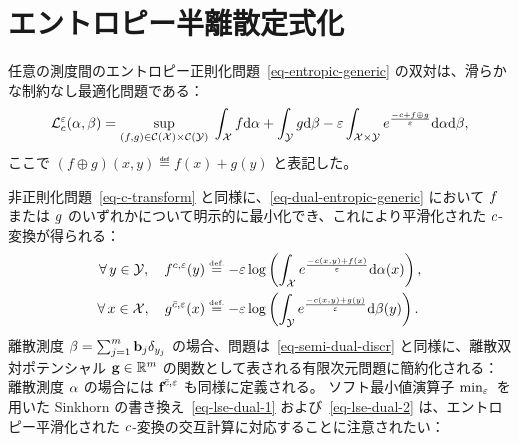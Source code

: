 \section{エントロピー半離散定式化}
\label{sec-semi-discr-entropy}

任意の測度間のエントロピー正則化問題~\eqref{eq-entropic-generic} の双対は、滑らかな制約なし最適化問題である：
\begin{equation}\label{eq-dual-entropic-generic}
	\mathcal{L}_c^\varepsilon(\alpha,\beta) =
	\underset{(f,g) \in \mathcal{C}(\mathcal{X}) \times \mathcal{C}(\mathcal{Y})}{\sup}\;
		 \int_{\mathcal{X}} f\mathrm{d}\alpha + \int_{\mathcal{Y}} g\mathrm{d}\beta
		- \varepsilon \int_{\mathcal{X} \times \mathcal{Y}}  e^{ \frac{-c + f \oplus g }{\varepsilon} } \mathrm{d}\alpha\mathrm{d}\beta,
\end{equation}
ここで $(f\oplus g)(x,y) \eqdef f(x)+g(y)$ と表記した。

非正則化問題~\eqref{eq-c-transform} と同様に、\eqref{eq-dual-entropic-generic} において $f$ または $g$ のいずれかについて明示的に最小化でき、これにより平滑化された $c$-変換が得られる：
\begin{align*}
	\forall \, y \in \mathcal{Y}, \quad
	f^{c,\varepsilon}(y) &\stackrel{\mbox{\upshape\tiny def.}}{=} - \varepsilon \log\left( 
			\int_{\mathcal{X}} e^{\frac{-c(x,y) + f(x)}{\varepsilon}} \mathrm{d}\alpha(x)
	 \right),\\
	\forall \, x \in \mathcal{X}, \quad
	g^{\bar{c},\varepsilon}(x) &\stackrel{\mbox{\upshape\tiny def.}}{=} - \varepsilon \log\left( 
			\int_{\mathcal{Y}} e^{\frac{-c(x,y) + g(y)}{\varepsilon}} \mathrm{d}\beta(y)
	 \right).
\end{align*}
離散測度 $\beta = \sum_{j=1}^m \mathrm{\textbf{b}}_j\delta_{y_j}$ の場合、問題は~\eqref{eq-semi-dual-discr} と同様に、離散双対ポテンシャル $\mathrm{\textbf{g}} \in \mathbb{R}^m$ の関数として表される有限次元問題に簡約化される：
離散測度 $\alpha$ の場合には $\mathrm{\textbf{f}}^{\bar{c},\varepsilon}$ も同様に定義される。
ソフト最小値演算子 $\text{min}_\varepsilon\,$ を用いた Sinkhorn の書き換え~\eqref{eq-lse-dual-1} および~\eqref{eq-lse-dual-2} は、エントロピー平滑化された $c$-変換の交互計算に対応することに注意されたい：

